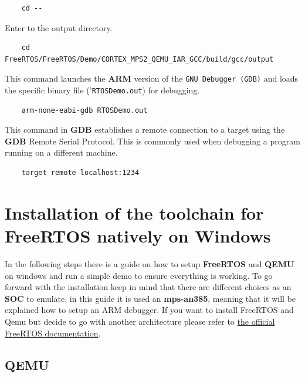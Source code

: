 \documentclass{exam}
\begin{document}
\begin{lstlisting}
    cd --
\end{lstlisting}
Enter to the output directory.
\begin{lstlisting}
    cd  FreeRTOS/FreeRTOS/Demo/CORTEX_MPS2_QEMU_IAR_GCC/build/gcc/output
\end{lstlisting}
This command launches the \textbf{ARM} version of the \texttt{GNU Debugger (GDB)} and loads the specific binary file ('\texttt{RTOSDemo.out}) for debugging.
\begin{lstlisting}
    arm-none-eabi-gdb RTOSDemo.out
\end{lstlisting}
This command in \textbf{GDB} establishes a remote connection to a target using the \textbf{GDB} Remote Serial Protocol. This is commonly used when debugging a program running on a different machine.
\begin{lstlisting}
    target remote localhost:1234
\end{lstlisting}



























\setcounter{enumi}{0}

\section{Installation of the toolchain for FreeRTOS natively on Windows}

In the following steps there is a guide on how to setup \textbf{FreeRTOS} and \textbf{QEMU} on windows and run a simple demo to ensure everything is working.
To go forward with the installation keep in mind that there are different choices as an \textbf{SOC} to emulate, in this guide it is used an \textbf{mps-an385}, meaning that it will be explained how to setup an ARM debugger. If you want to install FreeRTOS and Qemu but decide to go with another architecture please refer to \href{https://www.freertos.org/a00090.html}{the official FreeRTOS documentation}.

\subsection{QEMU}
\end{document}

